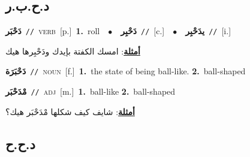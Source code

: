 \documentclass[10pt,a4paper,twoside]{article} %
\begin{document}
\begin{multicols}{2}
\vspace{-3mm}
\subsection*{\color{blue}\foreignlanguage{arabic}{د.ح.ب.ر}\color{blue}{}} 

{\setlength\topsep{0pt}\textbf{\foreignlanguage{arabic}{دَحْبَر}}\ {\color{gray}\texttt{//}\color{black}}\ \textsc{verb}\ [p.]\ \textbf{1.}~roll\ \ $\bullet$\ \ \setlength\topsep{0pt}\textbf{\foreignlanguage{arabic}{دَحْبِر}}\ {\color{gray}\texttt{//}\color{black}}\ [c.]\ \ $\bullet$\ \ \setlength\topsep{0pt}\textbf{\foreignlanguage{arabic}{يدَحْبِر}}\ {\color{gray}\texttt{//}\color{black}}\ [i.]\  \begin{flushright}\color{gray}\foreignlanguage{arabic}{\textbf{\underline{\foreignlanguage{arabic}{أمثلة}}}: امسك الكفتة بإيدك ودَحْبِرها هيك}\end{flushright}\color{black}} \vspace{2mm}

{\setlength\topsep{0pt}\textbf{\foreignlanguage{arabic}{دَحْبَرَة}}\ {\color{gray}\texttt{//}\color{black}}\ \textsc{noun}\ [f.]\ \textbf{1.}~the state of being ball-like.  \textbf{2.}~ball-shaped\ } \vspace{2mm}

{\setlength\topsep{0pt}\textbf{\foreignlanguage{arabic}{مْدَحْبَر}}\ {\color{gray}\texttt{//}\color{black}}\ \textsc{adj}\ [m.]\ \textbf{1.}~ball-like  \textbf{2.}~ball-shaped\  \begin{flushright}\color{gray}\foreignlanguage{arabic}{\textbf{\underline{\foreignlanguage{arabic}{أمثلة}}}: شايف كيف شكلها مْدَحْبَر هيك؟}\end{flushright}\color{black}} \vspace{2mm}

\vspace{-3mm}
\subsection*{\color{blue}\foreignlanguage{arabic}{د.ح.ح}\color{blue}{}} 


\end{multicols}
\end{document}
